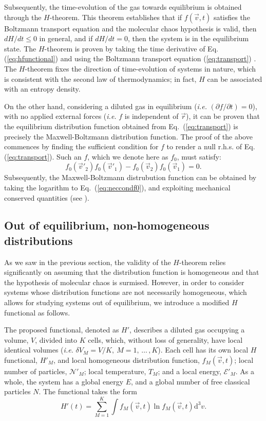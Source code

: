 Subsequently, the time-evolution of the gas towards equilibrium is obtained through the
$H$-theorem. This theorem establishes that if $f(\vec{v},t)$ satisfies the Boltzmann
transport equation and the molecular chaos hypothesis is valid, then
$dH/dt\leq0$ in general, and if $dH/dt=0$, then the system is in the equilibrium state.
The $H$-theorem is proven by taking the time derivative
of Eq. (\ref{eq:hfunctional}) and using the Boltzmann transport equation
(\ref{eq:transport}) \cite{bib:huang}. The $H$-theorem fixes the direction of time-evolution
of systems in nature, which is consistent with the second law of thermodynamics; in fact,
$H$ can be associated with an entropy density.

On the other hand, considering a diluted gas in equilibrium (\textit{i.e.}
$(\partial f/\partial t)=0$),
with no applied external forces (\textit{i.e.} $f$ is independent of $\vec r$), 
it can be proven that the equilibrium distribution function obtained from
Eq.~(\ref{eq:transport}) is precisely the Maxwell-Boltzmann
distribution function. The proof of the above commences by finding the sufficient
condition for $f$ to render a null r.h.s. of Eq. (\ref{eq:transport}). Such an
$f$, which we denote here as $f_0$, must satisfy:
%
\begin{equation}\label{eq:neccondf0}
    f_0(\vec{v}'_2)f_0(\vec{v}'_1)- f_0(\vec{v}_2)f_0(\vec{v}_1)=0.
\end{equation}
%
Subsequently, the Maxwell-Boltzmann distrubution function can be obtained by
taking the logarithm to Eq.~(\ref{eq:neccondf0}), and exploiting mechanical
conserved quantities (see \cite[ch. 4.2]{bib:huang}).

\subsection{Out of equilibrium, non-homogeneous distributions}

As we saw in the previous section,
the validity of the $H$-theorem relies significantly on assuming
that the distribution function is homogeneous and that the hypothesis of
molecular chaos is surmised. However, in order to consider systems whose
distribution functions are not necessarily homogeneous, which
allows for studying systems out of equilibrium,
we introduce a modified $H$ functional as follows.

The proposed functional, denoted as $H'$, describes a diluted gas occupying a volume, $V$,
divided into $K$ cells, which, without loss of generality,
have local identical volumes (\textit{i.e.} $\delta V_M = V/K,\ M=1,\,\dots\,,K$).
Each cell has its own local
$H$ functional, $H'_M$, and local homogeneous distribution function,
$f_{M}(\vec{v},t)$; local number of particles, $\mathcal{N}'_M$;
local temperature, $T_M$; and a local energy, $\mathcal{E}'_M$. As a whole, the system has a
global energy $E$, and a global number of free
classical particles $N$. The functional takes the form
%
\begin{equation}\label{eq:CH2}
   H'(t)=\sum_{M=1}^{K}\int f_M(\vec{v},t) \ln f_M(\vec{v},t)\mathrm{d}^3v.
\end{equation}
%


